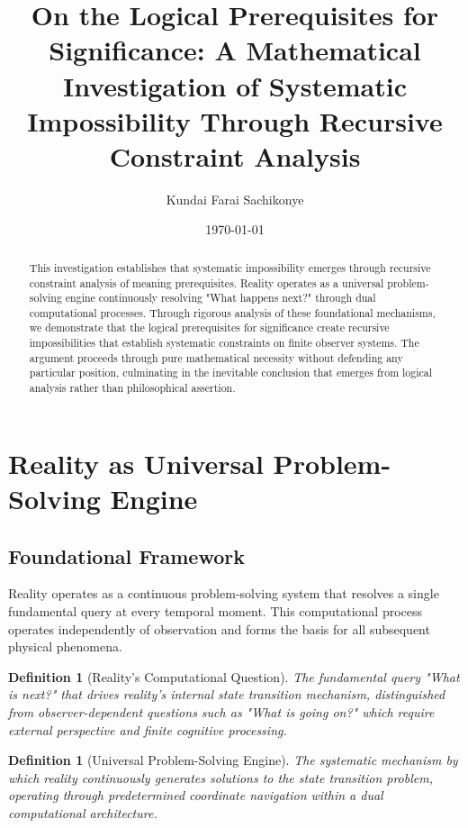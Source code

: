 \documentclass[12pt,a4paper]{article}
\title{On the Logical Prerequisites for Significance: A Mathematical Investigation of Systematic Impossibility Through Recursive Constraint Analysis}
\author{Kundai Farai Sachikonye}
\date{\today}
\newtheorem{definition}[theorem]{Definition}
\begin{document}
\maketitle

\begin{abstract}
This investigation establishes that systematic impossibility emerges through recursive constraint analysis of meaning prerequisites. Reality operates as a universal problem-solving engine continuously resolving "What happens next?" through dual computational processes. Through rigorous analysis of these foundational mechanisms, we demonstrate that the logical prerequisites for significance create recursive impossibilities that establish systematic constraints on finite observer systems. The argument proceeds through pure mathematical necessity without defending any particular position, culminating in the inevitable conclusion that emerges from logical analysis rather than philosophical assertion.
\end{abstract}

\tableofcontents

\section{Reality as Universal Problem-Solving Engine}

\subsection{Foundational Framework}

Reality operates as a continuous problem-solving system that resolves a single fundamental query at every temporal moment. This computational process operates independently of observation and forms the basis for all subsequent physical phenomena.

\begin{definition}[Reality's Computational Question]
The fundamental query "What is next?" that drives reality's internal state transition mechanism, distinguished from observer-dependent questions such as "What is going on?" which require external perspective and finite cognitive processing.
\end{definition}

\begin{definition}[Universal Problem-Solving Engine]
The systematic mechanism by which reality continuously generates solutions to the state transition problem, operating through predetermined coordinate navigation within a dual computational architecture.
\end{definition}
\end{document}
